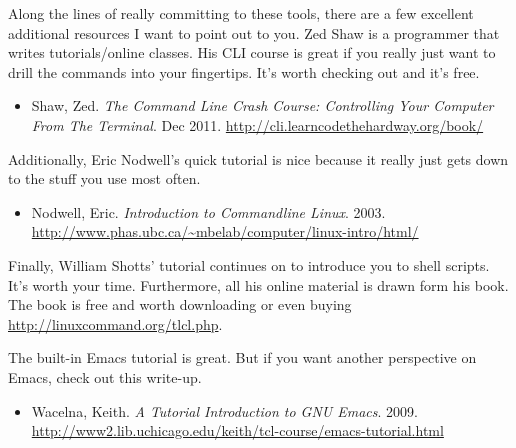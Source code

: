 \documentclass[]{tufte-handout}
\begin{document}
Along the lines of really committing to these tools, there are a few excellent additional resources I want to point out to you. Zed Shaw is a programmer that writes tutorials/online classes.  His CLI course is great if you really just want to drill the commands into your fingertips.  It's worth checking out and it's free.
\begin{itemize}
\item Shaw, Zed. \textit{The Command Line Crash Course: Controlling Your Computer From The Terminal}. Dec 2011. \url{http://cli.learncodethehardway.org/book/}
\end{itemize}
Additionally, Eric Nodwell's quick tutorial is nice because it really just gets down to the stuff you use most often.
\begin{itemize}
\item Nodwell, Eric. \textit{Introduction to Commandline Linux}. 2003. \url{http://www.phas.ubc.ca/~mbelab/computer/linux-intro/html/}
\end{itemize}
Finally, William Shotts' tutorial continues on to introduce you to shell scripts. It's worth your time.  Furthermore, all his online material is drawn form his book.  The book is free and worth downloading or even buying \url{http://linuxcommand.org/tlcl.php}.

The built-in Emacs tutorial is great. But if you want another perspective on Emacs, check out this write-up.
\begin{itemize}
\item Wacelna, Keith. \textit{A Tutorial Introduction to GNU Emacs}. 2009. \url{http://www2.lib.uchicago.edu/keith/tcl-course/emacs-tutorial.html}
\end{itemize}
\end{document}
